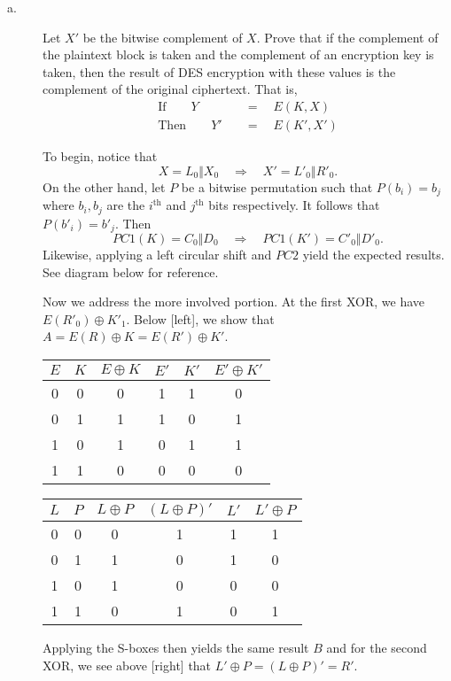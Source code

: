 \documentclass[../hw_sols.tex]{subfiles}
\begin{document}
\begin{description}

\item[a.] Let $X'$ be the bitwise complement of $X$. Prove that if the 
complement of the plaintext block is taken and the complement of an encryption 
key is taken, then the result of DES encryption with these values is the 
complement of the original ciphertext. That is,
\begin{align*}
	\text{If} \qquad Y \quad &= \quad E(K, X) \\
	\text{Then} \qquad Y' \quad &= \quad E(K', X')
\end{align*}

\begin{solution}

To begin, notice that 
	$$X = L_0 \Vert X_0 \quad \Rightarrow \quad X' = L'_0 \Vert R'_0.$$
On the other hand, let $P$ be a bitwise permutation such that $P(b_i) = b_j$ 
where $b_i, b_j$ are the $i^{\text{th}}$ and $j^{\text{th}}$ bits respectively. 
It follows that $P(b'_i) = b'_j$. Then
	$$PC1(K) = C_0 \Vert D_0 \quad 
	\Rightarrow 
	\quad PC1(K') = C'_0 \Vert D'_0.$$
Likewise, applying a left circular shift and $PC2$ yield the expected results. 
See diagram below for reference.
\begin{center}
	
\end{center}

Now we address the more involved portion. At the first XOR, we have 
$E(R'_0) \oplus K'_1$. Below [left], we show that 
$A = E(R) \oplus K = E(R') \oplus K'$.
	\begin{center}
	\begin{tabular}{ *{6}{ c } }
		$E$ & $K$ & $E \oplus K$ & $E'$ & $K'$ & $E' \oplus K'$ \\
		\hline
		0 & 0 & \cellcolor{yellow!75} 0 & 1 & 1 & \cellcolor{yellow!75} 0 \\
		0 & 1 & \cellcolor{yellow!75} 1 & 1 & 0 & \cellcolor{yellow!75} 1 \\
		1 & 0 & \cellcolor{yellow!75} 1 & 0 & 1 & \cellcolor{yellow!75} 1 \\
		1 & 1 & \cellcolor{yellow!75} 0 & 0 & 0 & \cellcolor{yellow!75} 0 
	\end{tabular}
	\hspace{1cm}
	\begin{tabular}{ *{6}{ c } }
		$L$ & $P$ & $L \oplus P$ & $(L \oplus P)'$ & $L'$ & $L' \oplus P$ \\
		\hline
		0 & 0 & 0 & \cellcolor{yellow!75} 1 & 1 & \cellcolor{yellow!75} 1 \\
		0 & 1 & 1 & \cellcolor{yellow!75} 0 & 1 & \cellcolor{yellow!75} 0 \\
		1 & 0 & 1 & \cellcolor{yellow!75} 0 & 0 & \cellcolor{yellow!75} 0 \\
		1 & 1 & 0 & \cellcolor{yellow!75} 1 & 0 & \cellcolor{yellow!75} 1 
	\end{tabular}
	\end{center}
Applying the S-boxes then yields the same result $B$ and for the second XOR, 
we see above [right] that \newline $L' \oplus P = (L \oplus P)' = R'$.


\end{solution}
\end{description}
\end{document}
